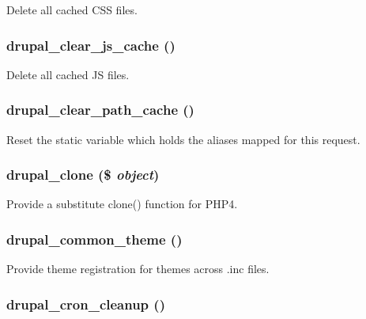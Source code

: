 Delete all cached CSS files. \hypertarget{common_8inc_c05e083cb7cb02084601f8d2103b0405}{
\subsubsection[{drupal\_\-clear\_\-js\_\-cache}]{\setlength{\rightskip}{0pt plus 5cm}drupal\_\-clear\_\-js\_\-cache ()}}
\label{common_8inc_c05e083cb7cb02084601f8d2103b0405}


Delete all cached JS files. \hypertarget{common_8inc_1c3a768c3c1b4751977330e20f098c32}{
\subsubsection[{drupal\_\-clear\_\-path\_\-cache}]{\setlength{\rightskip}{0pt plus 5cm}drupal\_\-clear\_\-path\_\-cache ()}}
\label{common_8inc_1c3a768c3c1b4751977330e20f098c32}


Reset the static variable which holds the aliases mapped for this request. \hypertarget{common_8inc_14f9e44c0897f4950c1714483a811fc8}{
\subsubsection[{drupal\_\-clone}]{\setlength{\rightskip}{0pt plus 5cm}drupal\_\-clone (\$ {\em object})}}
\label{common_8inc_14f9e44c0897f4950c1714483a811fc8}


Provide a substitute clone() function for PHP4. \hypertarget{common_8inc_1263ef82e0da5b85f8203783ed164872}{
\subsubsection[{drupal\_\-common\_\-theme}]{\setlength{\rightskip}{0pt plus 5cm}drupal\_\-common\_\-theme ()}}
\label{common_8inc_1263ef82e0da5b85f8203783ed164872}


Provide theme registration for themes across .inc files. \hypertarget{common_8inc_9067aaeb503fb9f994d98728130390a2}{
\subsubsection[{drupal\_\-cron\_\-cleanup}]{\setlength{\rightskip}{0pt plus 5cm}drupal\_\-cron\_\-cleanup ()}}
\label{common_8inc_9067aaeb503fb9f994d98728130390a2}


